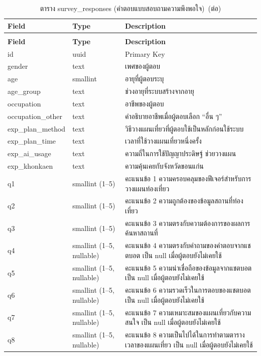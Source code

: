 \begin{longtable}{|p{3.6cm}|p{2.6cm}|p{6.8cm}|}
\caption{ตาราง survey\_responses (คำตอบแบบสอบถามความพึงพอใจ)}\label{tab:db_survey}\\
\hline
\textbf{Field} & \textbf{Type} & \textbf{Description} \\
\hline
\endfirsthead
\caption[]{ตาราง survey\_responses (คำตอบแบบสอบถามความพึงพอใจ)~(\textnormal{ต่อ})}\\
\hline
\textbf{Field} & \textbf{Type} & \textbf{Description} \\
\hline
\endhead
id & uuid & Primary Key \\ \hline
gender & text & เพศของผู้ตอบ \\ \hline
age & smallint & อายุที่ผู้ตอบระบุ \\ \hline
age\_group & text & ช่วงอายุที่ระบบสร้างจากอายุ \\ \hline
occupation & text & อาชีพของผู้ตอบ \\ \hline
occupation\_other & text & คำอธิบายอาชีพเมื่อผู้ตอบเลือก ``อื่น ๆ'' \\ \hline
exp\_plan\_method & text & วิธีวางแผนเที่ยวที่ผู้ตอบใช้เป็นหลักก่อนใช้ระบบ \\ \hline
exp\_plan\_time & text & เวลาที่ใช้วางแผนเที่ยวหนึ่งครั้ง \\ \hline
exp\_ai\_usage & text & ความถี่ในการใช้ปัญญาประดิษฐ์ ช่วยวางแผน \\ \hline
exp\_khonkaen & text & ความคุ้นเคยกับจังหวัดขอนแก่น \\ \hline
q1 & smallint (1--5) & คะแนนข้อ 1 ความครอบคลุมของฟีเจอร์สำหรับการวางแผนท่องเที่ยว \\ \hline
q2 & smallint (1--5) & คะแนนข้อ 2 ความถูกต้องของข้อมูลสถานที่ท่องเที่ยว \\ \hline
q3 & smallint (1--5) & คะแนนข้อ 3 ความตรงกับความต้องการของผลการค้นหาสถานที่ \\ \hline
q4 & smallint (1--5, nullable) & คะแนนข้อ 4 ความตรงกับคำถามของคำตอบจากแชตบอต เป็น null เมื่อผู้ตอบยังไม่เคยใช้ \\ \hline
q5 & smallint (1--5, nullable) & คะแนนข้อ 5 ความน่าเชื่อถือของข้อมูลจากแชตบอต เป็น null เมื่อผู้ตอบยังไม่เคยใช้ \\ \hline
q6 & smallint (1--5, nullable) & คะแนนข้อ 6 ความรวดเร็วในการตอบของแชตบอต เป็น null เมื่อผู้ตอบยังไม่เคยใช้ \\ \hline
q7 & smallint (1--5, nullable) & คะแนนข้อ 7 ความเหมาะสมของแผนเที่ยวกับความสนใจ เป็น null เมื่อผู้ตอบยังไม่เคยใช้ \\ \hline
q8 & smallint (1--5, nullable) & คะแนนข้อ 8 ความเป็นไปได้ในการทำตามตารางเวลาของแผนเที่ยว เป็น null เมื่อผู้ตอบยังไม่เคยใช้ \\ \hline

\end{longtable}
